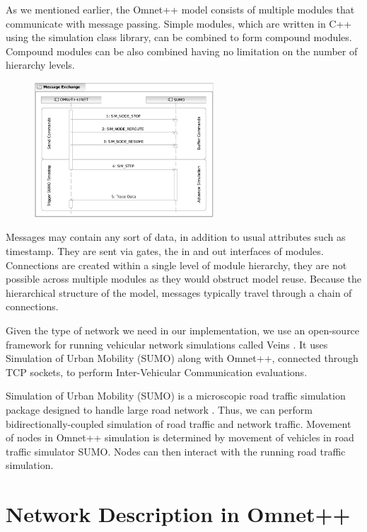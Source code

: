 As we mentioned earlier, the Omnet++ model consists of multiple modules that
communicate with message passing. Simple modules, which are written in C++ using
the simulation class library, can be combined to form compound modules. Compound
modules can be also combined having no limitation on the number of hierarchy
levels.

\begin{figure}[t]
	\centering
	\includegraphics[width=0.6\textwidth]{img/bidirectional_com}
\end{figure}

Messages may contain any sort of data, in addition to usual attributes such as
timestamp. They are sent via gates, the in and out interfaces of modules.
Connections are created within a single level of module hierarchy, they are not
possible across multiple modules as they would obstruct model reuse. Because the
hierarchical structure of the model, messages typically travel through a chain
of connections.

Given the type of network we need in our implementation, we use an
open-source framework for running vehicular network simulations called Veins \cite{veins}.
It uses Simulation of Urban Mobility (SUMO) along with Omnet++, connected
through TCP sockets, to perform Inter-Vehicular Communication evaluations.

Simulation of Urban Mobility (SUMO) is a microscopic road traffic simulation
package designed to handle large road network \cite{sumo}. Thus, we can perform
bidirectionally-coupled simulation of road traffic and network traffic. Movement
of nodes in Omnet++ simulation is determined by movement of vehicles in road
traffic simulator SUMO. Nodes can then interact with the running road traffic
simulation.

\section{Network Description in Omnet++}

